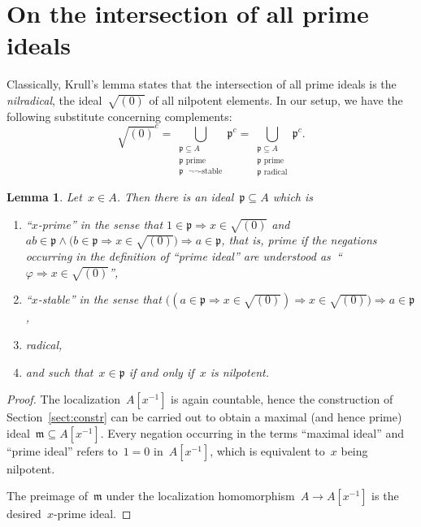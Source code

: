 \documentclass[com,11pt,crcready]{iosart2x}
\theoremstyle{definition}
\theoremstyle{plain}
\newtheorem{lemma}[definition]{Lemma}
\theoremstyle{remark}
\newcommand{\?}{\,{:}\,}
\newcommand{\mmm}{\mathfrak{m}}
\newcommand{\ppp}{\mathfrak{p}}
\renewcommand{\_}{\mathpunct{.}\,}
\begin{document}
\section{On the intersection of all prime ideals}
\label{sect:krull}

Classically, Krull's lemma states that the intersection of all prime ideals is the
\emph{nilradical}, the ideal~$\sqrt{(0)}$ of all nilpotent elements. In our
setup, we have the following substitute concerning complements:
\[ \sqrt{(0)}^c =
  \bigcup_{\substack{\text{$\ppp \subseteq A$}\\\text{$\ppp$ prime}\\\text{$\ppp$ $\neg\neg$-stable}}} \ppp^c =
  \bigcup_{\substack{\text{$\ppp \subseteq A$}\\\text{$\ppp$ prime}\\\text{$\ppp$ radical}}} \ppp^c. \]

\begin{lemma}\label{lemma:x-prime}
Let~$x \in A$. Then there is an ideal~$\ppp \subseteq A$ which is
\begin{enumerate}
\item ``$x$-prime'' in the sense that
$1 \in \ppp \Rightarrow x \in \sqrt{(0)}$ and
$ab \in \ppp \wedge \bigl(b \in \ppp \Rightarrow x \in \sqrt{(0)}\bigr) \Longrightarrow
   a \in \ppp$,
that is, prime if the negations occurring in the definition of ``prime ideal''
are understood as~``$\varphi \Rightarrow x \in \sqrt{(0)}$'',
\item ``$x$-stable'' in the sense that
$\bigl((a \in \ppp \Rightarrow x \in \sqrt{(0)}) \Rightarrow x \in \sqrt{(0)}\bigr)
  \Rightarrow a \in \ppp$,
\item radical,
\item and such that~$x \in \ppp$ if and only if~$x$ is nilpotent.
\end{enumerate}
\end{lemma}

\begin{proof}The localization~$A[x^{-1}]$ is again countable, hence the
construction of Section~\ref{sect:constr} can be carried out to obtain a
maximal (and hence prime) ideal~$\mmm \subseteq A[x^{-1}]$. Every negation
occurring in the terms ``maximal ideal'' and ``prime ideal'' refers to~$1 = 0$
in~$A[x^{-1}]$, which is equivalent to~$x$ being nilpotent.

The preimage of~$\mmm$ under the localization homomorphism~$A \to A[x^{-1}]$ is
the desired~$x$-prime ideal.
\end{proof}
\end{document}
